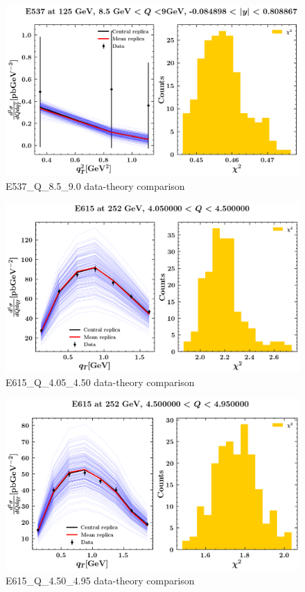 \documentclass[]{article}
\begin{document}
\begin{figure}
\centering
\includegraphics{pngplots/E537_Q_8.5_9.0.png}
\caption{E537\_Q\_8.5\_9.0 data-theory comparison}
\end{figure}

\begin{figure}
\centering
\includegraphics{pngplots/E615_Q_4.05_4.50.png}
\caption{E615\_Q\_4.05\_4.50 data-theory comparison}
\end{figure}

\begin{figure}
\centering
\includegraphics{pngplots/E615_Q_4.50_4.95.png}
\caption{E615\_Q\_4.50\_4.95 data-theory comparison}
\end{figure}
\end{document}
